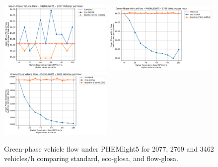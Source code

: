 \begin{figure}[htb]
  \centering
  \includegraphics[width=0.49\textwidth]{data/img/GreenPhaseVehicleFlow/GreenPhaseVehicleFlow_PHEMLIGHT5_Cars1500.pdf}
  \includegraphics[width=0.49\textwidth]{data/img/GreenPhaseVehicleFlow/GreenPhaseVehicleFlow_PHEMLIGHT5_Cars2000.pdf}
  \includegraphics[width=0.49\textwidth]{data/img/GreenPhaseVehicleFlow/GreenPhaseVehicleFlow_PHEMLIGHT5_Cars2500.pdf}
  \caption{Green‐phase vehicle flow under PHEMlight5 for 2077, 2769 and 3462 vehicles/h comparing standard, \ac{eco-glosa}, and \ac{flow-glosa}.}
  \label{fig:PHEM_Flow}
\end{figure}

